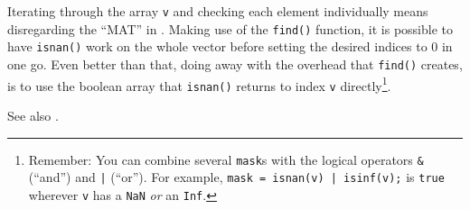 Iterating through the array \lstinline!v! and checking each element individually means disregarding the ``MAT'' in \matlab{}. Making use of the \lstinline!find()! function, it is possible to have \lstinline!isnan()! work on the whole vector before setting the desired indices to 0 in one go. Even better than that, doing away with the overhead that \lstinline!find()! creates, is to use the boolean array that \lstinline!isnan()! returns to index \lstinline!v! directly\footnote{Remember: You can combine several \lstinline!mask!s with the logical operators \lstinline!&! (``and'') and \lstinline!|! (``or''). For example, \lstinline!mask = isnan(v) | isinf(v);! is \lstinline!true! wherever \lstinline!v! has a \lstinline!NaN! \emph{or} an \lstinline!Inf!.}.


% 
% 
% 
% 
% 
% 



See also \cite{Mathworks:2001:MIM}.



